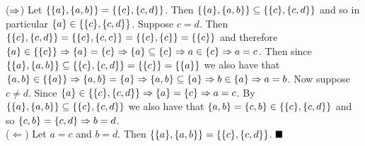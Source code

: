 \documentclass[12pt]{book}
\begin{document}
\begin{enumerate}
{($\then$) Let $\set{\set{a},\set{a,b}} = \set{\set{c},\set{c,d}}$. Then $\set{\set{a},\set{a,b}} \subseteq \set{\set{c},\set{c,d}}$ and so in particular $\set{a} \in \set{\set{c},\set{c,d}}$. Suppose $c = d$. Then $\set{\set{c},\set{c,d}} = \set{\set{c},\set{c,c}} = \set{\set{c},\set{c}} = \set{\set{c}}$ and therefore $\set{a} \in \set{\set{c}} \then \set{a} = \set{c} \then \set{a} \subseteq \set{c} \then a \in \set{c} \then a = c$. Then since $\set{\set{a},\set{a,b}} \subseteq \set{\set{c},\set{c,d}} = \set{\set{c}} = \set{\set{a}}$ we also have that $\set{a,b} \in \set{\set{a}} \then \set{a,b} = \set{a} \then \set{a,b} \subseteq \set{a} \then b \in \set{a} \then a = b$. Now suppose $c \neq d$. Since $\set{a} \in \set{\set{c},\set{c,d}} \then \set{a} = \set{c} \then a = c$. By $\set{\set{a},\set{a,b}} \subseteq \set{\set{c},\set{c,d}}$ we also have that $\set{a,b} = \set{c,b} \in \set{\set{c},\set{c,d}}$ and so $\set{c,b} = \set{c,d} \then b = d$.\\ ($\Leftarrow$) Let $a = c$ and $b = d$. Then $\set{\set{a},\set{a,b}} = \set{\set{c},\set{c,d}}$. $\qed$}
\end{enumerate}

\hrulefill
\end{document}
